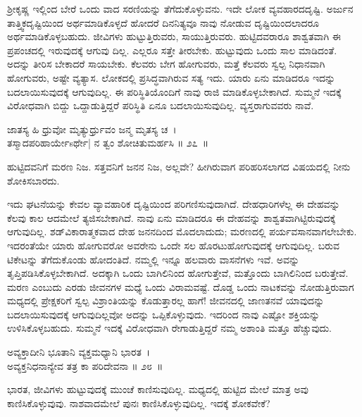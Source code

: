 ಶ‍್ರೀಕೃಷ್ಣ ಇಲ್ಲಿಂದ ಬೇರೆ ಒಂದು ವಾದ ಸರಣಿಯನ್ನು ತೆಗೆದುಕೊಳ್ಳುವನು. ಇದೇ ಲೋಕ ವ್ಯವಹಾರದದೃಷ್ಟಿ. ಅರ್ಜುನ ತಾತ್ತ್ವಿಕದೃಷ್ಟಿಯಿಂದ ಅರ್ಥಮಾಡಿಕೊಳ್ಳದೆ ಹೋದರೆ ದಿನನಿತ್ಯವೂ ನಾವು ನೋಡುವ ದೃಷ್ಟಿಯಿಂದಲಾದರೂ ಅರ್ಥಮಾಡಿಕೊಳ್ಳಬಹುದು. ಜೀವಿಗಳು ಹುಟ್ಟುತ್ತಿರುವರು, ಸಾಯುತ್ತಿರುವರು. ಹುಟ್ಟಿದವರಾರೂ ಶಾಶ್ವತವಾಗಿ ಈ ಪ್ರಪಂಚದಲ್ಲಿ ಇರುವುದಕ್ಕೆ ಆಗುವು ದಿಲ್ಲ. ಎಲ್ಲರೂ ಸತ್ತೇ ತೀರಬೇಕು. ಹುಟ್ಟುವುದು ಒಂದು ಸಾಲ ಮಾಡಿದಂತೆ. ಅದನ್ನು ತೀರಿಸ ಬೇಕಾದರೆ ಸಾಯಬೇಕು. ಕೆಲವರು ಬೇಗ ಹೋಗುವರು, ಮತ್ತೆ ಕೆಲವರು ಸ್ವಲ್ಪ ನಿಧಾನವಾಗಿ ಹೋಗುವರು, ಅಷ್ಟೇ ವ್ಯತ್ಯಾಸ. ಲೋಕದಲ್ಲಿ ಪ್ರಸಿದ್ಧವಾಗಿರುವ ಸತ್ಯ ಇದು. ಯಾರು ಏನು ಮಾಡಿದರೂ ಇದನ್ನು ಬದಲಾಯಿಸುವುದಕ್ಕೆ ಆಗುವುದಿಲ್ಲ. ಈ ಪರಿಸ್ಥಿತಿಯೊಂದಿಗೆ ನಾವು ರಾಜಿ ಮಾಡಿಕೊಳ್ಳಬೇಕಾಗಿದೆ. ಸುಮ್ಮನೆ ಇದಕ್ಕೆ ವಿರೋಧವಾಗಿ ಬಿದ್ದು ಒದ್ದಾಡುತ್ತಿದ್ದರೆ ಪರಿಸ್ಥಿತಿ ಏನೂ ಬದಲಾಯಿಸುವುದಿಲ್ಲ. ವ್ಯಸ್ತರಾಗುವವರು ನಾವೆ.

\begin{shloka}
ಜಾತಸ್ಯ ಹಿ ಧ್ರುವೋ ಮೃತ್ಯುರ್ಧ್ರುವಂ ಜನ್ಮ ಮೃತಸ್ಯ ಚ~।\\ತಸ್ಮಾದಪರಿಹಾರ್ಯೇsರ್ಥೇ| ನ ತ್ವಂ ಶೋಚಿತುಮರ್ಹಸಿ \hfill॥ ೨೭~॥
\end{shloka}

\begin{artha}
ಹುಟ್ಟಿದವನಿಗೆ ಮರಣ ನಿಜ. ಸತ್ತವನಿಗೆ ಜನನ ನಿಜ, ಅಲ್ಲವೇ? ಹೀಗಿರುವಾಗ ಪರಿಹರಿಸಲಾಗದ ವಿಷಯದಲ್ಲಿ ನೀನು ಶೋಕಿಸಬಾರದು.
\end{artha}

ಇದು ಘಟನೆಯನ್ನು ಕೇವಲ ವ್ಯಾವಹಾರಿಕ ದೃಷ್ಟಿಯಿಂದ ಪರಿಗಣಿಸುವುದಾಗಿದೆ. ದೇಹಧಾರಿಗಳೆಲ್ಲ ಈ ದೇಹವನ್ನು ಕೆಲವು ಕಾಲ ಆದಮೇಲೆ ತ್ಯಜಿಸಬೇಕಾಗಿದೆ. ನಾವು ಏನು ಮಾಡಿದರೂ ಈ ದೇಹವನ್ನು ಶಾಶ್ವತವಾಗಿಟ್ಟಿರುವುದಕ್ಕೆ ಆಗುವುದಿಲ್ಲ. ಶಡ್​ವಿಕಾರಾತ್ಮಕವಾದ ದೇಹ ಜನನದಿಂದ ಮೊದಲಾದುದು; ಮರಣದಲ್ಲಿ ಪರ್ಯವಸಾನವಾಗಲೇಬೇಕು. ಇದರಂತೆಯೇ ಯಾರು ಹೋಗುವರೋ ಅವರೇನು ಒಂದೇ ಸಲ ಹೊರಟುಹೋಗುವುದಕ್ಕೆ ಆಗುವುದಿಲ್ಲ. ಬರುವ ಟಿಕೇಟನ್ನು ತೆಗೆದುಕೊಂಡು ಹೋದಂತಿದೆ. ನಮ್ಮಲ್ಲಿ ಇನ್ನೂ ಹಲವಾರು ವಾಸನೆಗಳು ಇವೆ. ಅವನ್ನು ತೃಪ್ತಿಪಡಿಸಿಕೊಳ್ಳಬೇಕಾಗಿದೆ. ಅದಕ್ಕಾಗಿ ಒಂದು ಬಾಗಿಲಿನಿಂದ ಹೋಗುತ್ತೇವೆ, ಮತ್ತೊಂದು ಬಾಗಿಲಿನಿಂದ ಬರುತ್ತೇವೆ. ಮರಣ ಎಂಬುದು ಎರಡು ಜೀವನಗಳ ಮಧ್ಯೆ ಒಂದು ವಿರಾಮವಷ್ಟೆ. ದೊಡ್ಡ ಒಂದು ನಾಟಕವನ್ನು ನೋಡುತ್ತಿರುವಾಗ ಮಧ್ಯದಲ್ಲಿ ಪ್ರೇಕ್ಷಕರಿಗೆ ಸ್ವಲ್ಪ ವಿಶ್ರಾಂತಿಯನ್ನು ಕೊಡುತ್ತಾರಲ್ಲ ಹಾಗೆ! ಜೀವನದಲ್ಲಿ ಜಾಣತನವೆ ಯಾವುದನ್ನು ಬದಲಾಯಿಸುವುದಕ್ಕೆ ಆಗುವು\-ದಿಲ್ಲವೋ ಅದನ್ನು ಒಪ್ಪಿಕೊಳ್ಳುವುದು. ಇದರಿಂದ ನಾವು ಎಷ್ಟೋ ಶಕ್ತಿಯನ್ನು ಉಳಿಸಿಕೊಳ್ಳಬಹುದು. ಸುಮ್ಮನೆ ಇದಕ್ಕೆ ವಿರೋಧವಾಗಿ ರೇಗಾಡುತ್ತಿದ್ದರೆ ನಮ್ಮ ಅಶಾಂತಿ ಮತ್ತೂ ಹೆಚ್ಚುವುದು.

\begin{shloka}
ಅವ್ಯಕ್ತಾದೀನಿ ಭೂತಾನಿ ವ್ಯಕ್ತಮಧ್ಯಾನಿ ಭಾರತ~।\\ಅವ್ಯಕ್ತನಿಧನಾನ್ಯೇವ ತತ್ರ ಕಾ ಪರಿದೇವನಾ \hfill॥ ೨೮~॥
\end{shloka}

\begin{artha}
ಭಾರತ, ಜೀವಿಗಳು ಹುಟ್ಟುವುದಕ್ಕೆ ಮುಂಚೆ ಕಾಣಿಸುವುದಿಲ್ಲ. ಮಧ್ಯದಲ್ಲಿ ಹುಟ್ಟಿದ ಮೇಲೆ ಮಾತ್ರ ಅವು ಕಾಣಿಸಿಕೊಳ್ಳುವುವು. ನಾಶವಾದಮೇಲೆ ಪುನಃ ಕಾಣಿಸಿಕೊಳ್ಳುವುದಿಲ್ಲ. ಇದಕ್ಕೆ ಶೋಕವೇಕೆ?
\end{artha}

